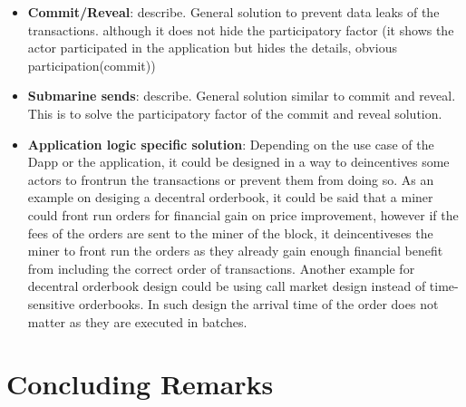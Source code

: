 \begin{itemize}
\item{\textbf{Commit/Reveal}: describe. General solution to prevent data leaks of the transactions. although it does not hide the participatory factor (it shows the actor participated in the application but hides the details, obvious participation(commit))}
\item{\textbf{Submarine sends}: describe. General solution similar to commit and reveal. This is to solve the participatory factor of the commit and reveal solution.}

\item{\textbf{Application logic specific solution}: Depending on the use case of  the Dapp or the application, it could be designed in a way to deincentives some actors to frontrun the transactions or prevent them from doing so. As an example on desiging a decentral orderbook, it could be said that a miner could front run orders for financial gain on price improvement, however if the fees of the orders are sent to the miner of the block, it deincentiveses the miner to front run the orders as they already gain enough financial benefit from including the correct order of transactions. 
Another example for decentral orderbook design could be using call market design instead of  time-sensitive orderbooks. In such design the arrival time of the order does not matter as they are executed in batches. }


\end{itemize}







\section{Concluding Remarks}




